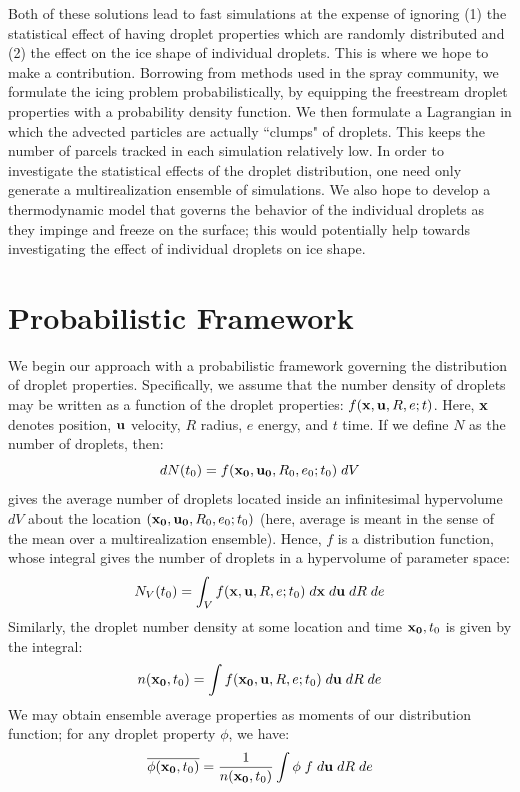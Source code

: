 \documentclass{article}
\begin{document}
Both of these solutions lead to fast simulations at the expense of ignoring (1) the statistical effect of 
having droplet properties which are randomly distributed and (2) the effect on the ice shape of individual 
droplets. This is where we hope to make a contribution. Borrowing from methods used in the spray 
community, we formulate the icing problem probabilistically, by equipping the freestream droplet 
properties with a probability density function. We then formulate a Lagrangian in which the advected 
particles are actually ``clumps" of droplets. This keeps the number of parcels tracked in each simulation 
relatively low. In order to investigate the statistical effects of the droplet distribution, one need only generate 
a multirealization ensemble of simulations. We also hope to develop a thermodynamic model that governs the 
behavior of the individual droplets as they impinge and freeze on the surface; this would potentially help 
towards investigating the effect of individual droplets on ice shape.

\newpage
\section{Probabilistic Framework}
We begin our approach with a probabilistic framework governing the distribution of droplet properties. 
Specifically, we assume that the number density of droplets may be written as a function of the droplet 
properties: $f({\bf x}, {\bf u}, R, e; t)$. Here, ${\bf x}$ denotes position, ${\bf u}$ velocity, $R$ radius, $e$ 
energy, and $t$ time. If we define $N$ as the number of droplets, then:
\begin{equation}
\label{dN}
dN(t_0) = f({\bf x_0}, {\bf u_0}, R_0, e_0; t_0) \; dV
\end{equation}
gives the average number of droplets 
located inside an infinitesimal hypervolume $dV$ about the location $({\bf x_0}, {\bf u_0}, R_0, e_0; t_0)$ 
(here, average is meant in the sense of the mean over a multirealization ensemble). Hence, $f$ is a 
distribution function, whose integral gives the number of droplets in a hypervolume of parameter space:
\begin{equation}
N_{V}(t_0) = \int_{V} f({\bf x}, {\bf u}, R, e; t_0) \; d{\bf x} \; d{\bf u} \; dR \; de
\end{equation}
Similarly, the droplet number density at some location and time ${\bf x_0}, t_0$ is given by the integral:
\begin{equation}
n({\bf x_0}, t_0) = \int f({\bf x_0}, {\bf u}, R, e; t_0) \; d{\bf u} \; dR \; de
\end{equation}
We may obtain ensemble average properties as moments of our distribution function; for any droplet 
property $\phi$, we have:
\begin{equation}
\overline{\phi({\bf x_0},t_0)} = \frac{1}{n({\bf x_0}, t_0)} \int \phi \; f \; d{\bf u} \; dR \; de 
\end{equation}
\end{document}
